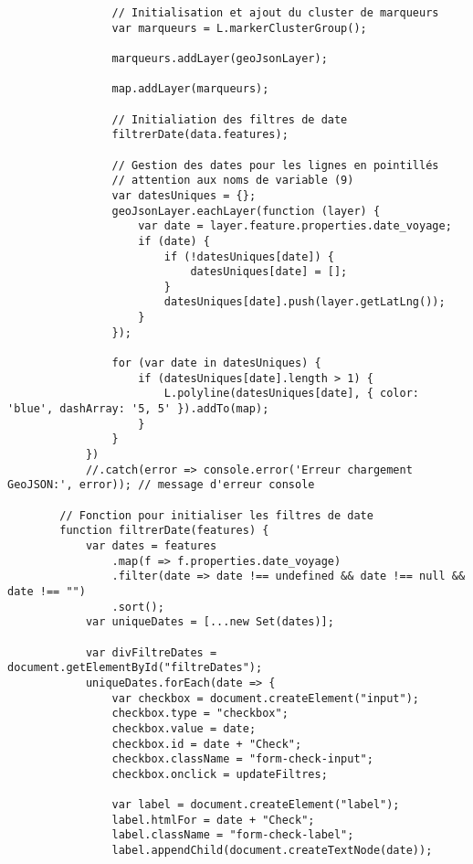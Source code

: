 \begin{verbatim}
                // Initialisation et ajout du cluster de marqueurs
                var marqueurs = L.markerClusterGroup();

                marqueurs.addLayer(geoJsonLayer);
                
                map.addLayer(marqueurs);

                // Initialiation des filtres de date
                filtrerDate(data.features);

                // Gestion des dates pour les lignes en pointillés
                // attention aux noms de variable (9)
                var datesUniques = {};
                geoJsonLayer.eachLayer(function (layer) {
                    var date = layer.feature.properties.date_voyage;
                    if (date) {
                        if (!datesUniques[date]) {
                            datesUniques[date] = [];
                        }
                        datesUniques[date].push(layer.getLatLng());
                    }
                });

                for (var date in datesUniques) {
                    if (datesUniques[date].length > 1) {
                        L.polyline(datesUniques[date], { color: 'blue', dashArray: '5, 5' }).addTo(map);
                    }
                }
            })
            //.catch(error => console.error('Erreur chargement GeoJSON:', error)); // message d'erreur console
            
        // Fonction pour initialiser les filtres de date
        function filtrerDate(features) {
            var dates = features
                .map(f => f.properties.date_voyage)
                .filter(date => date !== undefined && date !== null && date !== "")
                .sort();
            var uniqueDates = [...new Set(dates)];

            var divFiltreDates = document.getElementById("filtreDates");
            uniqueDates.forEach(date => {
                var checkbox = document.createElement("input");
                checkbox.type = "checkbox";
                checkbox.value = date;
                checkbox.id = date + "Check";
                checkbox.className = "form-check-input";
                checkbox.onclick = updateFiltres;

                var label = document.createElement("label");
                label.htmlFor = date + "Check";
                label.className = "form-check-label";
                label.appendChild(document.createTextNode(date));


\end{verbatim}
